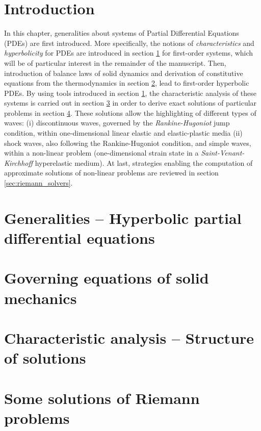 \section*{Introduction}
In this chapter, generalities about systems of Partial Differential Equations (PDEs) are first introduced. More specifically, the notions of \textit{characteristics} and \textit{hyperbolicity} for PDEs are introduced in section \ref{sec:PDEs} for first-order systems, which will be of particular interest in the remainder of the manuscript.
Then, introduction of balance laws of solid dynamics and derivation of constitutive equations from the thermodynamics in section \ref{sec:solidMech_equations}, lead to first-order hyperbolic PDEs.
By using tools introduced in section \ref{sec:PDEs}, the characteristic analysis of these systems is carried out in section \ref{sec:characteristic_analysis} in order to derive exact solutions of particular problems in section \ref{sec:riemann_problems}. These solutions allow the highlighting of different types of waves: (i) discontinuous waves, governed by the \textit{Rankine-Hugoniot} jump condition, within one-dimensional linear elastic and elastic-plastic media (ii) shock waves, also following the Rankine-Hugoniot condition, and simple waves, within a non-linear problem (one-dimensional strain state in a \textit{Saint-Venant-Kirchhoff} hyperelastic medium).
At last, strategies enabling the computation of approximate solutions of non-linear problems are reviewed in section \ref{sec:riemann_solvers}.


\section{Generalities -- Hyperbolic partial differential equations}
\label{sec:PDEs}


\section{Governing equations of solid mechanics}
\label{sec:solidMech_equations}



\section{Characteristic analysis -- Structure of solutions}
\label{sec:characteristic_analysis}


\section{Some solutions of Riemann problems}
\label{sec:riemann_problems}

